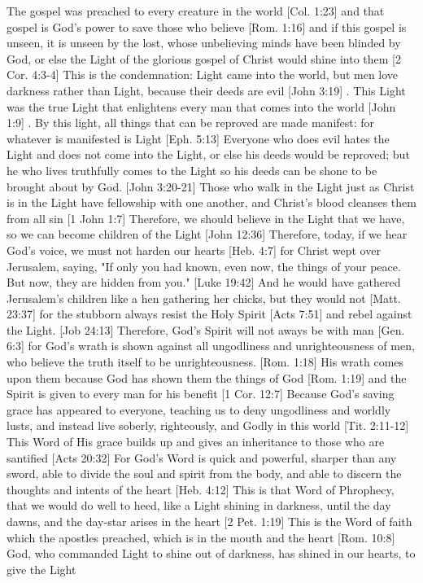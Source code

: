 \documentclass[../main.tex] {subfiles}
\begin{document}
	The gospel was preached to every creature in the world [Col. 1:23]  and that gospel is God's power to save those who believe [Rom. 1:16]  and if this gospel is unseen, it is unseen by the lost, whose unbelieving minds have been blinded by God, or else the Light of the glorious gospel of Christ would shine into them [2 Cor. 4:3-4]  This is the condemnation: Light came into the world, but men love darkness rather than Light, because their deeds are evil [John 3:19] . This Light was the true Light that enlightens every man that comes into the world [John 1:9] . By this light, all things that can be reproved are made manifest: for whatever is manifested is Light [Eph. 5:13]  Everyone who does evil hates the Light and does not come into the Light, or else his deeds would be reproved; but he who lives truthfully comes to the Light so his deeds can be shone to be brought about by God. [John 3:20-21]  Those who walk in the Light just as Christ is in the Light have fellowship with one another, and Christ's blood cleanses them from all sin [1 John 1:7]  Therefore, we should believe in the Light that we have, so we can become children of the Light [John 12:36]  Therefore, today, if we hear God's voice, we must not harden our hearts [Heb. 4:7]  for Christ wept over Jerusalem, saying, "If only you had known, even now,  the things of your peace. But now, they are hidden from you." [Luke 19:42]  And he would have gathered Jerusalem's children like a hen gathering her chicks, but they would not [Matt. 23:37]  for the stubborn always resist the Holy Spirit [Acts 7:51]  and rebel against the Light. [Job 24:13]  Therefore, God's Spirit will not aways be with man [Gen. 6:3]  for God's wrath is shown against all ungodliness and unrighteousness of men, who believe the truth itself to be unrighteousness. [Rom. 1:18]  His wrath comes upon them because God has shown them the things of God [Rom. 1:19]  and the Spirit is given to every man for his benefit [1 Cor. 12:7]  Because God's saving grace has appeared to everyone, teaching us to deny ungodliness and worldly lusts, and instead live soberly, righteously, and Godly in this world [Tit. 2:11-12]  This Word of His grace builds up and gives an inheritance to those who are santified [Acts 20:32]  For God's Word is quick and powerful, sharper than any sword, able to divide the soul and spirit from the body, and able to discern the thoughts and intents of the heart [Heb. 4:12]  This is that Word of Phrophecy, that we would do well to heed, like a Light shining in darkness, until the day dawns, and the day-star arises in the heart [2 Pet. 1:19]  This is the Word of faith which the apostles preached, which is in the mouth and the heart [Rom. 10:8]  God, who commanded Light to shine out of darkness, has shined in our hearts, to give the Light 
\end{document}
